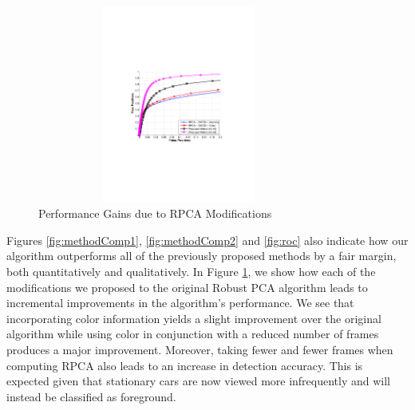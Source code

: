 \documentclass{article}
\begin{document}
\begin{figure}[t]
\begin{minipage}[b]{\linewidth}
  \centering
  \centerline{\includegraphics[trim = 35mm 87mm 30mm 92mm, clip, width=9.25cm, height =6.5cm]{Imgs/ROC_RPCA_IMP.pdf}}
\end{minipage}

\caption{Performance Gains due to RPCA Modifications}
\label{fig:roc2}
\end{figure}


Figures \ref{fig:methodComp1}, \ref{fig:methodComp2} and \ref{fig:roc} also indicate how our algorithm outperforms all of the previously proposed methods by a fair margin, both quantitatively and qualitatively. In Figure \ref{fig:roc2}, we show how each of the modifications we proposed to the original Robust PCA algorithm leads to incremental improvements in the algorithm's performance. We see that incorporating color information yields a slight improvement over the original algorithm while using color in conjunction with a reduced number of frames produces a major improvement. Moreover, taking fewer and fewer frames when computing RPCA also leads to an increase in detection accuracy. This is expected given that stationary cars are now viewed more infrequently and will instead be classified as foreground.%
\end{document}
